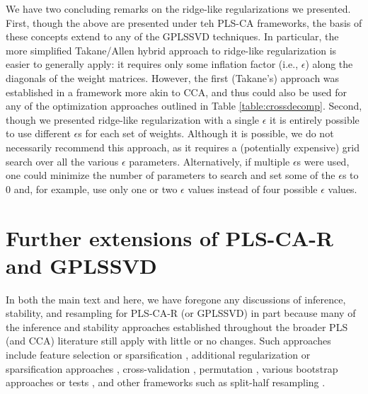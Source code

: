 \documentclass[12pt]{article}
\begin{document}
We have two concluding remarks on the ridge-like regularizations we
presented. First, though the above are presented under teh PLS-CA
frameworks, the basis of these concepts extend to any of the GPLSSVD
techniques. In particular, the more simplified Takane/Allen hybrid
approach to ridge-like regularization is easier to generally apply: it
requires only some inflation factor (i.e., \(\epsilon\)) along the
diagonals of the weight matrices. However, the first (Takane's) approach
was established in a framework more akin to CCA, and thus could also be
used for any of the optimization approaches outlined in Table
\ref{table:crossdecomp}. Second, though we presented ridge-like
regularization with a single \(\epsilon\) it is entirely possible to use
different \(\epsilon\)s for each set of weights. Although it is
possible, we do not necessarily recommend this approach, as it requires
a (potentially expensive) grid search over all the various \(\epsilon\)
parameters. Alternatively, if multiple \(\epsilon\)s were used, one
could minimize the number of parameters to search and set some of the
\(\epsilon\)s to 0 and, for example, use only one or two \(\epsilon\)
values instead of four possible \(\epsilon\) values.

\hypertarget{further-extensions-of-pls-ca-r-and-gplssvd}{%
\section{Further extensions of PLS-CA-R and
GPLSSVD}\label{further-extensions-of-pls-ca-r-and-gplssvd}}

In both the main text and here, we have foregone any discussions of
inference, stability, and resampling for PLS-CA-R (or GPLSSVD) in part
because many of the inference and stability approaches established
throughout the broader PLS (and CCA) literature still apply with little
or no changes. Such approaches include feature selection or
sparsification \citep{sutton_sparse_2018}, additional regularization or
sparsification approaches
\citep{le_floch_significant_2012-1, guillemot2019constrained, tenenhaus_variable_2014, tenenhaus_regularized_2011},
cross-validation
\citep{wold_principal_1987, rodriguez-perez_overoptimism_2018, kvalheim_number_2019, abdi_partial_2010-1},
permutation \citep{berry_permutation_2011, winkler2020permutation},
various bootstrap approaches
\citep{abdi_partial_2010-1, takane_regularized_2009-1} or tests
\citep{mcintosh_partial_2004, krishnan_partial_2011}, and other
frameworks such as split-half resampling
\citep{strother_quantitative_2002-1, kovacevic2013revisiting, strother2004optimizing}.



\end{document}
